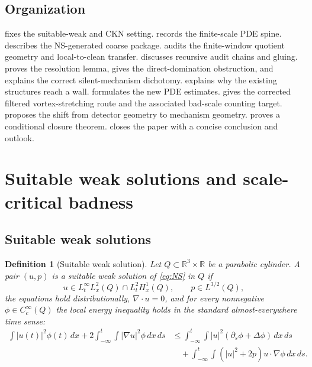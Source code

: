 \documentclass[11pt]{article}
\numberwithin{equation}{section}
\newtheorem{definition}[theorem]{Definition}
\theoremstyle{remark}
\newcommand{\R}{\mathbb R}
\newcommand{\dx}{\,dx}
\begin{document}
\subsection{Organization}

 fixes the suitable-weak and CKN setting.  records the finite-scale PDE spine.  describes the NS-generated coarse package.  audits the finite-window quotient geometry and local-to-clean transfer.  discusses recursive audit chains and gluing.  proves the resolution lemma, gives the direct-domination obstruction, and explains the correct silent-mechanism dichotomy.  explains why the existing structures reach a wall.  formulates the new PDE estimates.  gives the corrected filtered vortex-stretching route and the associated bad-scale counting target.  proposes the shift from detector geometry to mechanism geometry.  proves a conditional closure theorem.  closes the paper with a concise conclusion and outlook.

\section{Suitable weak solutions and scale-critical badness}\label{sec:preliminaries}

\subsection{Suitable weak solutions}

\begin{definition}[Suitable weak solution]\label{def:suitable}
Let $Q\subset\R^3\times\R$ be a parabolic cylinder. A pair $(u,p)$ is a suitable weak solution of \eqref{eq:NS} in $Q$ if
\[
u\in L^\infty_tL^2_x(Q)\cap L^2_tH^1_x(Q),
\qquad p\in L^{3/2}(Q),
\]
the equations hold distributionally, $\nabla\cdot u=0$, and for every nonnegative $\phi\in C_c^\infty(Q)$ the local energy inequality holds in the standard almost-everywhere time sense:
\begin{align}\label{eq:LEI}
\int |u(t)|^2\phi(t)\dx
+2\int_{-\infty}^t\!\int |\nabla u|^2\phi\dx\,ds
&\le
\int_{-\infty}^t\!\int |u|^2(\partial_s\phi+\Delta\phi)\dx\,ds\\
&\quad+
\int_{-\infty}^t\!\int (|u|^2+2p)u\cdot\nabla\phi\dx\,ds.
\end{align}
\end{definition}
\end{document}
